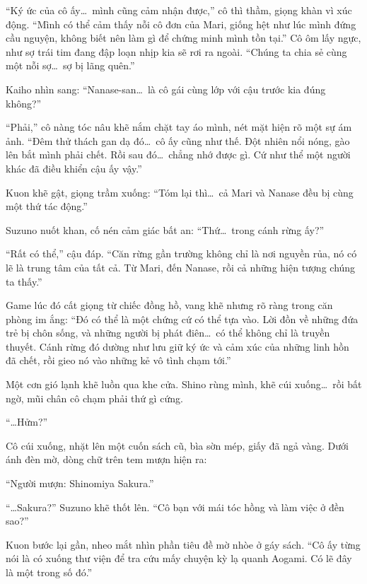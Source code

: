 \documentclass[../main.tex]{subfiles}
\begin{document}
``Ký ức của cô ấy\dots\ mình cũng cảm nhận được,'' cô thì thầm, giọng khàn vì xúc động. ``Mình có thể cảm thấy nỗi cô đơn của Mari, giống hệt như lúc mình đứng cầu nguyện, không biết nên làm gì để chứng minh mình tồn tại.'' Cô ôm lấy ngực, như sợ trái tim đang đập loạn nhịp kia sẽ rơi ra ngoài. ``Chúng ta chia sẻ cùng một nỗi sợ\dots\ sợ bị lãng quên.''

Kaiho nhìn sang: ``Nanase-san\dots\ là cô gái cùng lớp với cậu trước kia đúng không?''

``Phải,'' cô nàng tóc nâu khẽ nắm chặt tay áo mình, nét mặt hiện rõ một sự ám ảnh. ``Đêm thử thách gan dạ đó\dots\ cô ấy cũng như thế. Đột nhiên nổi nóng, gào lên bắt mình phải chết. Rồi sau đó\dots\ chẳng nhớ được gì. Cứ như thể một người khác đã điều khiển cậu ấy vậy.''

Kuon khẽ gật, giọng trầm xuống: ``Tóm lại thì\dots\ cả Mari và Nanase đều bị cùng một thứ tác động.''

Suzuno nuốt khan, cố nén cảm giác bất an: ``Thứ\dots\ trong cánh rừng ấy?''

``Rất có thể,'' cậu đáp. ``Căn rừng gần trường không chỉ là nơi nguyền rủa, nó có lẽ là trung tâm của tất cả. Từ Mari, đến Nanase, rồi cả những hiện tượng chúng ta thấy.''

Game lúc đó cất giọng từ chiếc đồng hồ, vang khẽ nhưng rõ ràng trong căn phòng im ắng: ``Đó có thể là một chứng cứ có thể tựa vào. Lời đồn về những đứa trẻ bị chôn sống, và những người bị phát điên\dots\ có thể không chỉ là truyền thuyết. Cánh rừng đó dường như lưu giữ ký ức và cảm xúc của những linh hồn đã chết, rồi gieo nó vào những kẻ vô tình chạm tới.''

Một cơn gió lạnh khẽ luồn qua khe cửa. Shino rùng mình, khẽ cúi xuống\dots\ rồi bất ngờ, mũi chân cô chạm phải thứ gì cứng.

``\dots Hửm?''


Cô cúi xuống, nhặt lên một cuốn sách cũ, bìa sờn mép, giấy đã ngả vàng. Dưới ánh đèn mờ, dòng chữ trên tem mượn hiện ra:

\begin{center}
  ``Người mượn: Shinomiya Sakura.''
\end{center}

``\dots Sakura?'' Suzuno khẽ thốt lên. ``Cô bạn với mái tóc hồng và làm việc ở đền sao?''

Kuon bước lại gần, nheo mắt nhìn phần tiêu đề mờ nhòe ở gáy sách. ``Cô ấy từng nói là có xuống thư viện để tra cứu mấy chuyện kỳ lạ quanh Aogami. Có lẽ đây là một trong số đó.''
\end{document}
